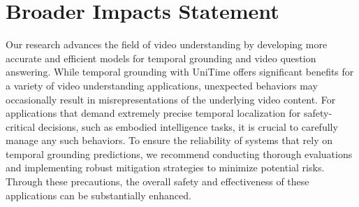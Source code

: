 \section{Broader Impacts Statement}
\label{sec:impacts}

Our research advances the field of video understanding by developing more accurate and efficient models for temporal grounding and video question answering. While temporal grounding with UniTime offers significant benefits for a variety of video understanding applications, unexpected behaviors may occasionally result in misrepresentations of the underlying video content. For applications that demand extremely precise temporal localization for safety-critical decisions, such as embodied intelligence tasks, it is crucial to carefully manage any such behaviors. To ensure the reliability of systems that rely on temporal grounding predictions, we recommend conducting thorough evaluations and implementing robust mitigation strategies to minimize potential risks. Through these precautions, the overall safety and effectiveness of these applications can be substantially enhanced.
